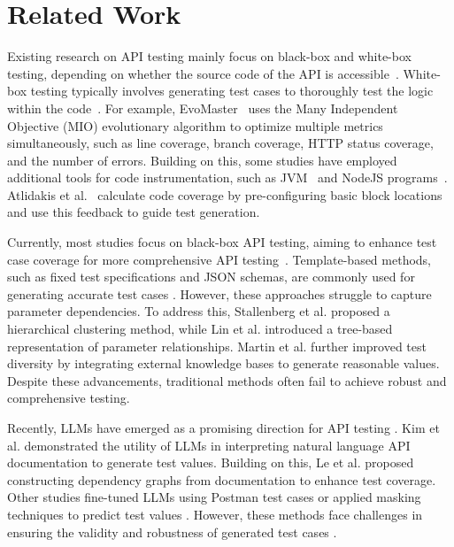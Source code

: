 \section{Related Work}

Existing research on API testing mainly focus on black-box and white-box testing, depending on whether the source code of the API is accessible~\cite{golmohammadi2023testing}. White-box testing typically involves generating test cases to thoroughly test the logic within the code~\cite{zhang2019resource}\cite{ zhang2021resource}. For example, EvoMaster~\cite{arcuri2020automated} uses the Many Independent Objective (MIO) evolutionary algorithm to optimize multiple metrics simultaneously, such as line coverage, branch coverage, HTTP status coverage, and the number of errors. Building on this, some studies have employed additional tools for code instrumentation, such as JVM~\cite{arcuri2018test}\cite{arcuri2019restful} and NodeJS programs~\cite{zhang2022javascript}\cite{moller2019model}. Atlidakis et al.~\cite{atlidakis2020pythia} calculate code coverage by pre-configuring basic block locations and use this feedback to guide test generation. 

Currently, most studies focus on black-box API testing, aiming to enhance test case coverage for more comprehensive API testing~\cite{viglianisi2020resttestgen}. Template-based methods, such as fixed test specifications and JSON schemas, are commonly used for generating accurate test cases \cite{benac2014jsongen}\cite{chakrabarti2009test}\cite{fertig2015model}\cite{arcuri2018testmio}\cite{godefroid2020intelligent}. However, these approaches struggle to capture parameter dependencies. To address this, Stallenberg et al. \cite{stallenberg2021improving} proposed a hierarchical clustering method, while Lin et al. \cite{lin2022forest} introduced a tree-based representation of parameter relationships. Martin et al. \cite{martin2020restest} further improved test diversity by integrating external knowledge bases to generate reasonable values. Despite these advancements, traditional methods often fail to achieve robust and comprehensive testing.

Recently, LLMs have emerged as a promising direction for API testing \cite{li2024application}\cite{olasehindeoptimizing}. Kim et al. \cite{kim2024leveraging} demonstrated the utility of LLMs in interpreting natural language API documentation to generate test values. Building on this, Le et al. \cite{le2024kat} proposed constructing dependency graphs from documentation to enhance test coverage. Other studies fine-tuned LLMs using Postman test cases \cite{deepika2024automating} or applied masking techniques to predict test values \cite{decrop2024you}. However, these methods face challenges in ensuring the validity and robustness of generated test cases \cite{pereira2024apitestgenie}.


